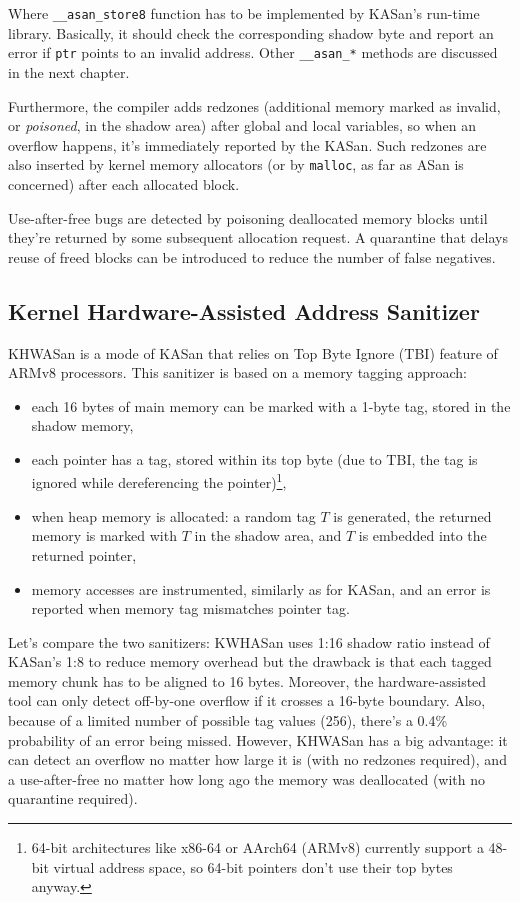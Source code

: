 \documentclass[shortabstract, manyadvisors, english, mgr]{iithesis}
\theoremstyle{definition} \newtheorem*{definition}{Definicja}
\theoremstyle{definition} \newtheorem*{example}{Przykład}
\theoremstyle{definition} \newtheorem*{remark}{Uwaga}
\begin{document}
Where \texttt{\_\_asan\_store8} function has to be implemented by KASan's run-time library. Basically, it should check the corresponding shadow byte and report an error if \texttt{ptr} points to an invalid address. Other \texttt{\_\_asan\_*} methods are discussed in the next chapter.

Furthermore, the compiler adds redzones (additional memory marked as invalid, or \textit{poisoned}, in the shadow area) after global and local variables, so when an overflow happens, it's immediately reported by the KASan. Such redzones are also inserted by kernel memory allocators (or by \texttt{malloc}, as far as ASan is concerned) after each allocated block.

Use-after-free bugs are detected by poisoning deallocated memory blocks until they're returned by some subsequent allocation request. A quarantine that delays reuse of freed blocks can be introduced to reduce the number of false negatives.

\subsection{Kernel Hardware-Assisted Address Sanitizer}
KHWASan \cite{bib:lwn-khwasan} is a mode of KASan that relies on Top Byte Ignore (TBI) feature of ARMv8 processors. This sanitizer is based on a memory tagging approach:
\begin{itemize}
    \item each 16 bytes of main memory can be marked with a 1-byte tag, stored in the shadow memory,
    \item each pointer has a tag, stored within its top byte (due to TBI, the tag is ignored while dereferencing the pointer)\footnote{64-bit architectures like x86-64 or AArch64 (ARMv8) currently support a 48-bit virtual address space, so 64-bit pointers don't use their top bytes anyway.},
    \item when heap memory is allocated: a random tag $T$ is generated, the returned memory is marked with $T$ in the shadow area, and $T$ is embedded into the returned pointer,
    \item memory accesses are instrumented, similarly as for KASan, and an error is reported when memory tag mismatches pointer tag.
\end{itemize}

Let's compare the two sanitizers: KWHASan uses 1:16 shadow ratio instead of KASan's 1:8 to reduce memory overhead but the drawback is that each tagged memory chunk has to be aligned to 16 bytes. Moreover, the hardware-assisted tool can only detect off-by-one overflow if it crosses a 16-byte boundary. Also, because of a limited number of possible tag values (256), there's a 0.4\% probability of an error being missed. However, KHWASan has a big advantage: it can detect an overflow no matter how large it is (with no redzones required), and a use-after-free no matter how long ago the memory was deallocated (with no quarantine required).
\end{document}
